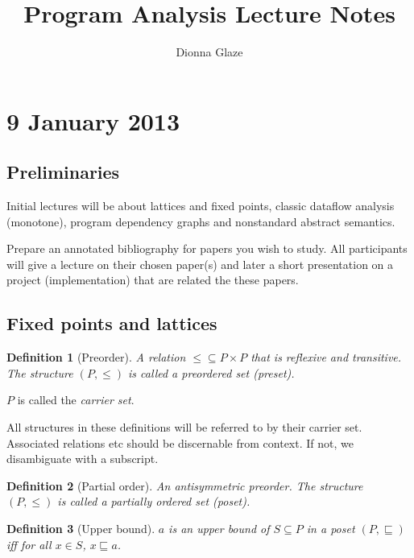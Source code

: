 \documentclass[11pt]{article}
\author{Dionna Glaze}
\title{Program Analysis Lecture Notes}
\newtheorem{definition}{Definition}
\begin{document}
\maketitle
\section{9 January 2013}

\subsection{Preliminaries}
Initial lectures will be about lattices and fixed points, classic
dataflow analysis (monotone), program dependency graphs and
nonstandard abstract semantics.

Prepare an annotated bibliography for papers you wish to study. All
participants will give a lecture on their chosen paper(s) and later a
short presentation on a project (implementation) that are related the these papers.


\subsection{Fixed points and lattices}

\begin{definition}[Preorder]
A relation $\le \subseteq P\times P$ that is reflexive and
transitive. The structure $(P,\le)$ is called a preordered set (preset).
\end{definition}
$P$ is called the \emph{carrier set}.

All structures in these definitions will be referred to by their
carrier set. Associated relations etc should be discernable from
context. If not, we disambiguate with a subscript.

\begin{definition}[Partial order]
An antisymmetric preorder. The structure $(P, \le)$ is called a partially ordered set (poset).
\end{definition}

\begin{definition}[Upper bound]
$a$ is an upper bound of $S \subseteq P$ in a poset
  $(P, \sqsubseteq)$ iff for all $x \in S$, $x \sqsubseteq a$.
\end{definition}
\end{document}
